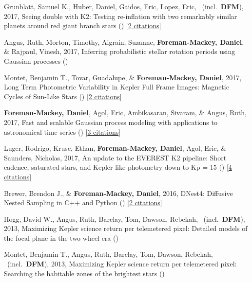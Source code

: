 \item[{\color{numcolor}\scriptsize8}] Grunblatt, Samuel K., Huber, Daniel, Gaidos, Eric, Lopez, Eric, \etal\ (incl.\ \textbf{DFM}), 2017, Seeing double with K2: Testing re-inflation with two remarkably similar planets around red giant branch stars () [\href{http://adsabs.harvard.edu/abs/2017arXiv170605865G}{2 citations}]

\item[{\color{numcolor}\scriptsize7}] Angus, Ruth, Morton, Timothy, Aigrain, Suzanne, \textbf{Foreman-Mackey, Daniel}, \& Rajpaul, Vinesh, 2017, Inferring probabilistic stellar rotation periods using Gaussian processes ()

\item[{\color{numcolor}\scriptsize6}] Montet, Benjamin T., Tovar, Guadalupe, \& \textbf{Foreman-Mackey, Daniel}, 2017, Long Term Photometric Variability in Kepler Full Frame Images: Magnetic Cycles of Sun-Like Stars () [\href{http://adsabs.harvard.edu/abs/2017arXiv170507928M}{2 citations}]

\item[{\color{numcolor}\scriptsize5}] \textbf{Foreman-Mackey, Daniel}, Agol, Eric, Ambikasaran, Sivaram, \& Angus, Ruth, 2017, Fast and scalable Gaussian process modeling with applications to astronomical time series () [\href{http://adsabs.harvard.edu/abs/2017arXiv170309710F}{3 citations}]

\item[{\color{numcolor}\scriptsize4}] Luger, Rodrigo, Kruse, Ethan, \textbf{Foreman-Mackey, Daniel}, Agol, Eric, \& Saunders, Nicholas, 2017, An update to the EVEREST K2 pipeline: Short cadence, saturated stars, and Kepler-like photometry down to Kp = 15 () [\href{http://adsabs.harvard.edu/abs/2017arXiv170205488L}{4 citations}]

\item[{\color{numcolor}\scriptsize3}] Brewer, Brendon J., \& \textbf{Foreman-Mackey, Daniel}, 2016, DNest4: Diffusive Nested Sampling in C++ and Python () [\href{http://adsabs.harvard.edu/abs/2016arXiv160603757B}{2 citations}]

\item[{\color{numcolor}\scriptsize2}] Hogg, David W., Angus, Ruth, Barclay, Tom, Dawson, Rebekah, \etal\ (incl.\ \textbf{DFM}), 2013, Maximizing Kepler science return per telemetered pixel: Detailed models of the focal plane in the two-wheel era ()

\item[{\color{numcolor}\scriptsize1}] Montet, Benjamin T., Angus, Ruth, Barclay, Tom, Dawson, Rebekah, \etal\ (incl.\ \textbf{DFM}), 2013, Maximizing Kepler science return per telemetered pixel: Searching the habitable zones of the brightest stars ()
